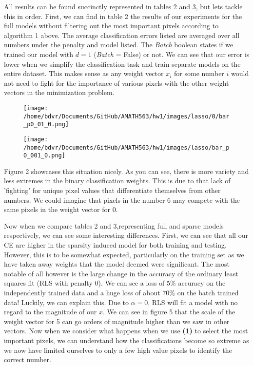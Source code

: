 \documentclass[12pt]{article}
\begin{document}
	All results can be found succinctly represented in tables 2 and 3, but lets tackle this in order. First, we can find in table 2 the results of our experiments for the full models without filtering out the most important pixels according to algorithm 1 above. The average classification errors listed are averaged over all numbers under the penalty and model listed. The \textit{Batch} boolean states if we trained our model with $d=1$ (\textit{Batch} = False) or not. We can see that our error is lower when we simplify the classification task and train separate models on the entire dataset. This makes sense as any weight vector $x_i$ for some number $i$ would not need to fight for the importance of various pixels with the other weight vectors in the minimization problem.
	\begin{figure}[H]
		\centering
		\begin{minipage}{.5\textwidth}
			\centering
			\texttt{[image: /home/bdvr/Documents/GitHub/AMATH563/hw1/images/lasso/0/bar\_p0\_01\_0.png]}
			\label{fig:test1}
		\end{minipage}%
		\begin{minipage}{.5\textwidth}
			\centering
			\texttt{[image: /home/bdvr/Documents/GitHub/AMATH563/hw1/images/lasso/bar\_p0\_001\_0.png]}
			\label{fig:test2}
		\end{minipage}
	\end{figure}
	Figure 2 showcases this situation nicely. As you can see, there is more variety and less extremes in the binary classification weights. This is due to that lack of 'fighting' for unique pixel values that differentiate themselves from other numbers. We could imagine that pixels in the number 6 may compete with the same pixels in the weight vector for 0.
	\par 
	Now when we compare tables 2 and 3,representing full and sparse models respectively, we can see some interesting differences. First, we can see that all our CE are higher in the sparsity induced model for both training and testing. However, this is to be somewhat expected, particularly on the training set as we have taken away weights that the model deemed were significant. The most notable of all however is the large change in the accuracy of the ordinary least squares fit (RLS with penalty 0). We can see a loss of $5\%$ accuracy on the independently trained data and a huge loss of about $70\%$ on the batch trained data! Luckily, we can explain this. Due to $\alpha = 0$, RLS will fit a model with no regard to the magnitude of our $x$. We can see in figure 5 that the scale of the weight vector for 5 can go orders of magnitude higher than we saw in other vectors. Now when we consider what happens when we use \textbf{(1)} to select the most important pixels, we can understand how the classifications become so extreme as we now have limited ourselves to only a few high value pixels to identify the correct number.
\end{document}
